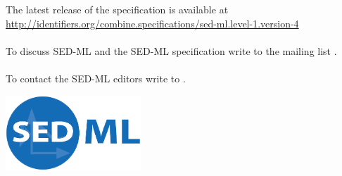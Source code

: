 \begin{titlepage}
\begin{center}
\vspace{1.2in}

\normalsize
\begin{minipage}{5in}
\begin{center}
  The latest release of the \currentLV specification is available at
  \url{http://identifiers.org/combine.specifications/sed-ml.level-1.version-4}
  \paragraph*{}
  To discuss SED-ML and the SED-ML specification write to the mailing list .

  \paragraph*{}
  To contact the SED-ML editors write to .
\end{center}
\end{minipage}
\vfill


\centerline{\includegraphics[width=2in]{images/logoSedml.png}}

\end{center}

\end{titlepage}

%
%

\setcounter{page}{2}



